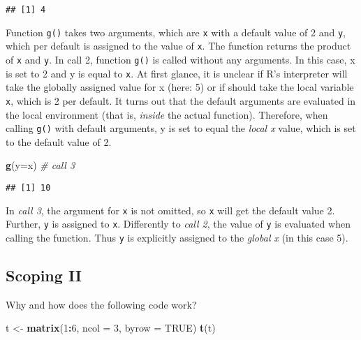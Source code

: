 \documentclass[12,]{article}
\newenvironment{Shaded}{\begin{snugshade}}{\end{snugshade}}
\newcommand{\KeywordTok}[1]{\textcolor[rgb]{0.13,0.29,0.53}{\textbf{#1}}}
\newcommand{\DataTypeTok}[1]{\textcolor[rgb]{0.13,0.29,0.53}{#1}}
\newcommand{\DecValTok}[1]{\textcolor[rgb]{0.00,0.00,0.81}{#1}}
\newcommand{\StringTok}[1]{\textcolor[rgb]{0.31,0.60,0.02}{#1}}
\newcommand{\CommentTok}[1]{\textcolor[rgb]{0.56,0.35,0.01}{\textit{#1}}}
\newcommand{\OtherTok}[1]{\textcolor[rgb]{0.56,0.35,0.01}{#1}}
\newcommand{\OperatorTok}[1]{\textcolor[rgb]{0.81,0.36,0.00}{\textbf{#1}}}
\newcommand{\NormalTok}[1]{#1}
\begin{document}
\begin{verbatim}
## [1] 4
\end{verbatim}

Function \texttt{g()} takes two arguments, which are \texttt{x} with a
default value of 2 and \texttt{y}, which per default is assigned to the
value of \texttt{x}. The function returns the product of \texttt{x} and
\texttt{y}. In call 2, function \texttt{g()} is called without any
arguments. In this case, x is set to 2 and y is equal to \texttt{x}. At
first glance, it is unclear if R's interpreter will take the globally
assigned value for x (here: 5) or if should take the local variable
\texttt{x}, which is 2 per default. It turns out that the default
arguments are evaluated in the local environment (that is, \emph{inside}
the actual function). Therefore, when calling \texttt{g()} with default
arguments, y is set to equal the \emph{local x} value, which is set to
the default value of 2.

\begin{Shaded}
\begin{Highlighting}[]
\KeywordTok{g}\NormalTok{(}\DataTypeTok{y=}\NormalTok{x)  }\CommentTok{# call 3}
\end{Highlighting}
\end{Shaded}

\begin{verbatim}
## [1] 10
\end{verbatim}

In \emph{call 3}, the argument for \texttt{x} is not omitted, so
\texttt{x} will get the default value 2. Further, \texttt{y} is assigned
to \texttt{x}. Differently to \emph{call 2}, the value of \texttt{y} is
evaluated when calling the function. Thus \texttt{y} is explicitly
assigned to the \emph{global x} (in this case 5).

\subsection*{Scoping II}\label{scoping-ii}

Why and how does the following code work?

\begin{Shaded}
\begin{Highlighting}[]
\NormalTok{t <-}\StringTok{ }\KeywordTok{matrix}\NormalTok{(}\DecValTok{1}\OperatorTok{:}\DecValTok{6}\NormalTok{, }\DataTypeTok{ncol =} \DecValTok{3}\NormalTok{, }\DataTypeTok{byrow =} \OtherTok{TRUE}\NormalTok{) }
\KeywordTok{t}\NormalTok{(t)}
\end{Highlighting}
\end{Shaded}
\end{document}
